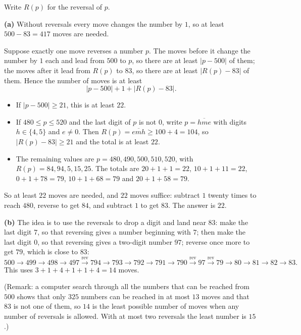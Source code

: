 Write $R(p)$ for the reversal of $p$.

\textbf{(a)} Without reversals every move changes the number by $1$, so at least $500-83=417$ moves are needed.

Suppose exactly one move reverses a number $p$. The moves before it change the number by $1$ each and lead from $500$ to $p$, so there are at least $|p-500|$ of them; the moves after it lead from $R(p)$ to $83$, so there are at least $|R(p)-83|$ of them. Hence the number of moves is at least
\[|p-500|+1+|R(p)-83|.\]
\begin{itemize}
\item If $|p-500|\ge21$, this is at least $22$.
\item If $480\le p\le520$ and the last digit of $p$ is not $0$, write $p=\overline{hme}$ with digits $h\in\{4,5\}$ and $e\ne0$. Then $R(p)=\overline{emh}\ge100+4=104$, so $|R(p)-83|\ge21$ and the total is at least $22$.
\item The remaining values are $p=480,490,500,510,520$, with $R(p)=84,94,5,15,25$. The totals are $20+1+1=22$, $10+1+11=22$, $0+1+78=79$, $10+1+68=79$ and $20+1+58=79$.
\end{itemize}
So at least $22$ moves are needed, and $22$ moves suffice: subtract $1$ twenty times to reach $480$, reverse to get $84$, and subtract $1$ to get $83$. The answer is $\boxed{22}$.

\textbf{(b)} The idea is to use the reversals to drop a digit and land near $83$: make the last digit $7$, so that reversing gives a number beginning with $7$; then make the last digit $0$, so that reversing gives a two-digit number $97$; reverse once more to get $79$, which is close to $83$:
\[500\to499\to498\to497\xrightarrow{\text{rev}}794\to793\to792\to791\to790\xrightarrow{\text{rev}}97\xrightarrow{\text{rev}}79\to80\to81\to82\to83.\]
This uses $3+1+4+1+1+4=\boxed{14}$ moves.

(Remark: a computer search through all the numbers that can be reached from $500$ shows that only $325$ numbers can be reached in at most $13$ moves and that $83$ is not one of them, so $14$ is the least possible number of moves when any number of reversals is allowed. With at most two reversals the least number is $15$.)
